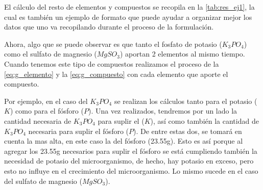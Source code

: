 El cálculo del resto de elementos y compuestos se recopila en la \autoref{tab:res_ej1}, la cual es también un ejemplo de formato que puede ayudar a organizar mejor los datos que uno va recopilando durante el proceso de la formulación.

    

Ahora, algo que se puede observar es que tanto el fosfato de potasio ($K_{3}PO_{4}$) como el sulfato de magnesio ($MgSO_{3}$) aportan 2 elementos al mismo tiempo. Cuando tenemos este tipo de compuestos realizamos el proceso de la \autoref{eq:g_elemento} y la \autoref{eq:g_compuesto} con cada elemento que aporte el compuesto.

Por ejemplo, en el caso del $K_{3}PO_{4}$ se realizan los cálculos tanto para el potasio ($K$) como para el fósforo ($P$). Una vez realizados, tendremos por un lado la cantidad necesaria de $K_{3}PO_{4}$ para suplir el ($K$), así como también la cantidad de $K_{3}PO_{4}$ necesaria para suplir el fósforo ($P$). De entre estas dos, se tomará en cuenta la mas alta, en este caso la del fósforo (23.55g). Esto es así porque al agregar los 23.55g necesarios para suplir el fósforo se está cumpliendo también la necesidad de potasio del microorganismo, de hecho, hay potasio en exceso, pero esto no influye en el crecimiento del microorganismo. Lo mismo sucede en el caso del sulfato de magnesio ($MgSO_{3}$).